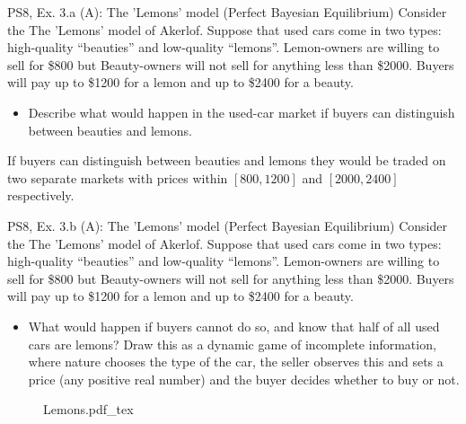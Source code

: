 \begin{frame}{PS8, Ex. 3.a (A): The 'Lemons' model (Perfect Bayesian Equilibrium)}
    Consider the The 'Lemons' model of Akerlof. Suppose that used cars come in two types: high-quality “beauties” and low-quality “lemons”. Lemon-owners are willing to sell for \$800 but Beauty-owners will not sell for anything less than \$2000. Buyers will pay up to \$1200 for a lemon and up to \$2400 for a beauty.
    \begin{itemize}
      \item[(a)] Describe what would happen in the used-car market if buyers can distinguish between beauties and lemons.
    \end{itemize}
    If buyers can distinguish between beauties and lemons they would be traded on two separate markets with prices within $[800,1200]$ and $[2000,2400]$ respectively.
\end{frame}

\begin{frame}{PS8, Ex. 3.b (A): The 'Lemons' model (Perfect Bayesian Equilibrium)}
    Consider the The 'Lemons' model of Akerlof. Suppose that used cars come in two types: high-quality “beauties” and low-quality “lemons”. Lemon-owners are willing to sell for \$800 but Beauty-owners will not sell for anything less than \$2000. Buyers will pay up to \$1200 for a lemon and up to \$2400 for a beauty.
    \vspace{-4pt}
    \begin{itemize}
      \item[(b)] What would happen if buyers cannot do so, and know that half of all used cars are lemons? Draw this as a dynamic game of incomplete information, where nature chooses the type of the car, the seller observes this and sets a price (any positive real number) and the buyer decides whether to buy or not.
    \end{itemize}
    \vspace{-8pt}
    \begin{figure}[!h]
      \center {}
      {Lemons.pdf_tex}
    \end{figure}
\end{frame}


